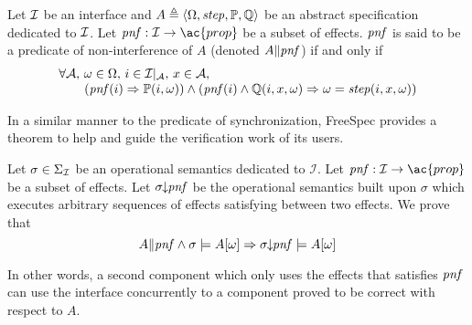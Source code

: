 \begin{definition}
  Let $\mathcal{I}$ be an interface and
  $A \triangleq \langle \Omega, \mathit{step}, \mathbb{P}, \mathbb{Q} \rangle$ be
  an abstract specification dedicated to $\mathcal{I}$. Let
  $\func{pnf} : \I \rightarrow \ac{prop}$ be a subset of effects. $\mathit{pnf}$
  is said to be a predicate of non-interference of $A$ (denoted
  $A \| \mathit{pnf}$) if and only if \[
    \begin{array}{l}
      \forall \mathcal{A}\text{, } \omega \in \Omega\text{, } i \in
      \mathcal{I}|_{\mathcal{A}}\text{, }x \in \mathcal{A}\text{, } \\ \qquad
      (\mathit{pnf}(i) \Rightarrow \mathbb{P}(i, \omega)) \wedge (\mathit{pnf}(i)
      \wedge \mathbb{Q}(i, x, \omega) \Rightarrow \omega = \mathit{step}(i, x,
      \omega))
    \end{array}
  \]
\end{definition}

In a similar manner to the predicate of synchronization, FreeSpec provides a
theorem to help and guide the verification work of its users.

\begin{theorem}
  Let $\sigma \in \Sigma_{\mathcal{I}}$ be an operational semantics dedicated to
  \( \mathcal{I}\).
  Let \( \func{pnf} : \I \rightarrow \ac{prop} \) be a subset of effects. Let
  \( \sigma\!\!\downarrow\!\!\mathit{pnf} \) be the operational semantics built
  upon \( \sigma \) which executes arbitrary sequences of effects satisfying
   between two effects.
  We prove that
  \[
    A \| \mathit{pnf} \wedge \sigma \models A[\omega] \Rightarrow
    \sigma\!\!\downarrow\!\!\mathit{pnf} \models A[\omega]
  \]
\end{theorem}

In other words, a second component which only uses the effects that satisfies
$\mathit{pnf}$ can use the interface concurrently to a component proved to be
correct with respect to \( A \).

